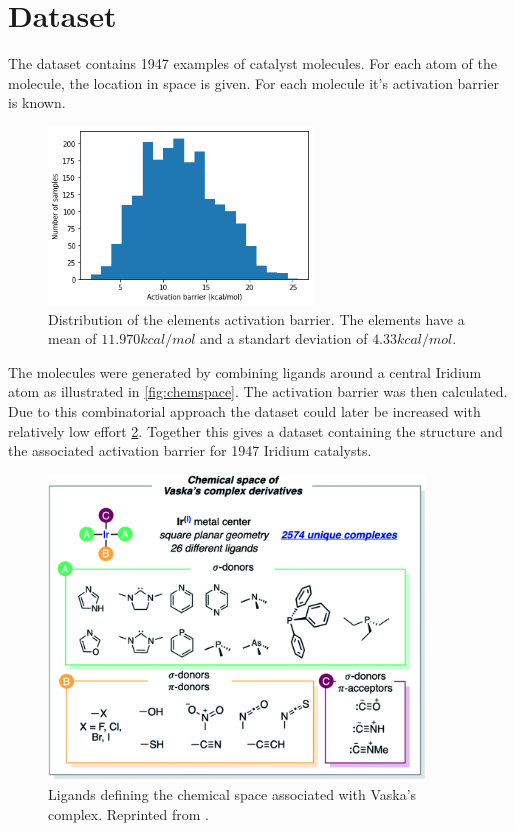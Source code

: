 \section{Dataset}

The dataset contains 1947 examples of catalyst molecules.
For each atom of the molecule, the location in space is given.
For each molecule it's activation barrier is known.

\begin{figure}
  \centering
  \includegraphics[width=7cm]{figures/introduction/barrier.png}
  \caption{Distribution of the elements activation barrier. The elements have a mean of $11.970 kcal/mol$ and a standart deviation of $4.33 kcal/mol$.}
  \label{fig:barriers}
\end{figure}

The molecules were generated by combining ligands around a central Iridium atom as illustrated in \autoref{fig:chemspace}.
The activation barrier was then calculated.
Due to this combinatorial approach the dataset could later be increased with relatively low effort \ref{fig:chemspace}.
Together this gives a dataset containing the structure and the associated activation barrier for 1947 Iridium catalysts.

\begin{figure}
  \centering
  \includegraphics[width=10cm]{figures/introduction/chem-space.png}
  \caption{Ligands defining the chemical space associated with Vaska's complex. Reprinted from \cite{friederich_dos}.}
  \label{fig:chemspace}
\end{figure}

